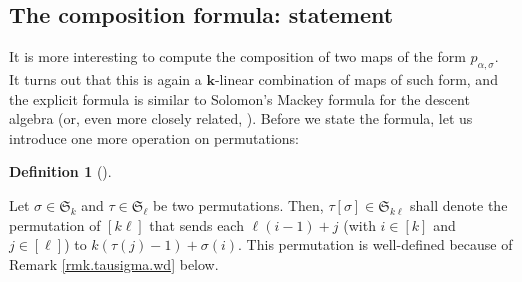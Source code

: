 \documentclass[numbers=enddot,12pt,final,onecolumn,notitlepage]{scrartcl}%
\theoremstyle{definition}
\newtheorem{defi}[theo]{Definition}
\newenvironment{definition}[1][]
{\begin{defi}[#1]\begin{leftbar}}
{\end{leftbar}\end{defi}}
\begin{document}
\subsection{The composition formula: statement}

It is more interesting to compute the composition of two maps of the form
$p_{\alpha,\sigma}$. It turns out that this is again a $\mathbf{k}$-linear
combination of maps of such form, and the explicit formula is similar to
Solomon's Mackey formula for the descent algebra (or, even more closely
related, \cite[Theorem 9.2 and \S 9.5.1]{Reuten93}). Before we state the
formula, let us introduce one more operation on permutations:

\begin{definition}
\label{def.tausigma}Let $\sigma\in\mathfrak{S}_{k}$ and $\tau\in
\mathfrak{S}_{\ell}$ be two permutations. Then, $\tau\left[  \sigma\right]
\in\mathfrak{S}_{k\ell}$ shall denote the permutation of $\left[
k\ell\right]  $ that sends each $\ell\left(  i-1\right)  +j$ (with
$i\in\left[  k\right]  $ and $j\in\left[  \ell\right]  $) to $k\left(
\tau\left(  j\right)  -1\right)  +\sigma\left(  i\right)  $. This permutation
is well-defined because of Remark \ref{rmk.tausigma.wd} below.
\end{definition}
\end{document}

